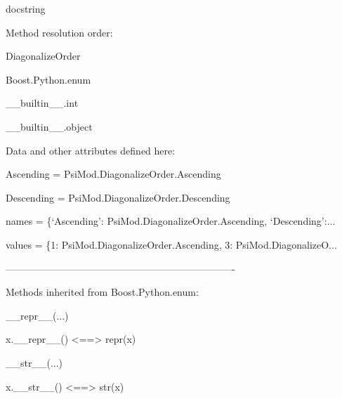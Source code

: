 \documentclass[letterpaper,10pt,english]{sphinxmanual}
\begin{document}
\begin{description}
\begin{description}
\item[{class DiagonalizeOrder(Boost.Python.enum)}] \leavevmode
\begin{DUlineblock}{0em}
\item[] docstring
\item[] 
\item[] Method resolution order:
\item[]
\begin{DUlineblock}{\DUlineblockindent}
\item[] DiagonalizeOrder
\item[] Boost.Python.enum
\item[] \_\_builtin\_\_.int
\item[] \_\_builtin\_\_.object
\item[] 
\end{DUlineblock}
\item[] Data and other attributes defined here:
\item[] 
\item[] Ascending = PsiMod.DiagonalizeOrder.Ascending
\item[] 
\item[] Descending = PsiMod.DiagonalizeOrder.Descending
\item[] 
\item[] names = \{`Ascending': PsiMod.DiagonalizeOrder.Ascending, `Descending':...
\item[] 
\item[] values = \{1: PsiMod.DiagonalizeOrder.Ascending, 3: PsiMod.DiagonalizeO...
\item[] 
\item[] ----------------------------------------------------------------------
\item[] Methods inherited from Boost.Python.enum:
\item[] 
\item[] \_\_repr\_\_(...)
\item[]
\begin{DUlineblock}{\DUlineblockindent}
\item[] x.\_\_repr\_\_() \textless{}==\textgreater{} repr(x)
\item[] 
\end{DUlineblock}
\item[] \_\_str\_\_(...)
\item[]
\begin{DUlineblock}{\DUlineblockindent}
\item[] x.\_\_str\_\_() \textless{}==\textgreater{} str(x)
\item[] 

\end{DUlineblock}
\end{DUlineblock}
\end{description}
\end{description}
\end{document}
